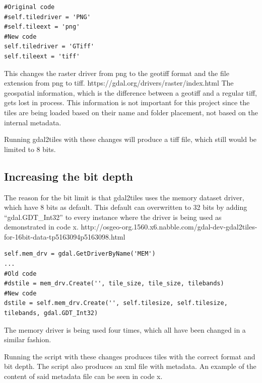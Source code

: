 \begin{lstlisting}[language=iPython, caption={Changing the file format}, label= VoresPY,escapechar=|]
 #Original code
#self.tiledriver = 'PNG'
#self.tileext = 'png'
#New code
self.tiledriver = 'GTiff'
self.tileext = 'tiff'
\end{lstlisting}
This changes the raster driver from png to the geotiff format and the file extension from png to tiff. 
https://gdal.org/drivers/raster/index.html
The geospatial information, which is the difference between a geotiff and a regular tiff, gets lost in process. This information is not important for this project since the tiles are being loaded based on their name and folder placement, not based on the internal metadata.

Running gdal2tiles with these changes will produce a tiff file, which still would be limited to 8 bits. 
\subsection{Increasing the bit depth}
The reason for the bit limit is that gdal2tiles uses the memory dataset driver, which have 8 bits as default.  This default can overwritten to 32 bits by adding “gdal.GDT\_Int32” to every instance where the driver is being used as demonstrated in code x. 
http://osgeo-org.1560.x6.nabble.com/gdal-dev-gdal2tiles-for-16bit-data-tp5163094p5163098.html

\begin{lstlisting}[language=iPython, caption={Increasing the bit depth}, label= VoresPY,escapechar=|]
self.mem_drv = gdal.GetDriverByName('MEM')
...
#Old code
#dstile = mem_drv.Create('', tile_size, tile_size, tilebands)
#New code
dstile = self.mem_drv.Create('', self.tilesize, self.tilesize, tilebands, gdal.GDT_Int32)
\end{lstlisting}
The memory driver is being used four times, which all have been changed in a similar fashion.

Running the script with these changes produces tiles with the correct format and bit depth. The script also produces an xml file with metadata. An example of the content of said metadata file can be seen in code x.

